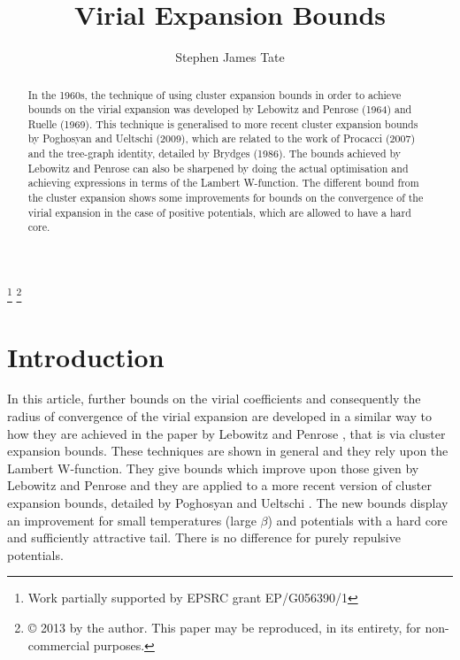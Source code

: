 \documentclass[reqno]{amsart}
\numberwithin{equation}{section}
\begin{document}
\title{Virial Expansion Bounds}


\author[S. J. Tate]{Stephen James Tate}
\address{Department of Mathematics, University of Warwick,
Coventry, CV4 7AL, United Kingdom}





\begin{abstract}
In the 1960s, the technique of using cluster expansion bounds in order to achieve bounds on the virial expansion was developed by Lebowitz and Penrose (1964) and Ruelle (1969). This technique is generalised to more recent cluster expansion bounds by Poghosyan and Ueltschi (2009), which are related to the work of Procacci (2007) and the tree-graph identity, detailed by Brydges (1986). The bounds achieved by Lebowitz and Penrose can also be sharpened by doing the actual optimisation and achieving expressions in terms of the Lambert W-function. The different bound from the cluster expansion shows some improvements for bounds on the convergence of the virial expansion in the case of positive potentials, which are allowed to have a hard core. 
\end{abstract}

\thanks{Work partially supported by EPSRC grant EP/G056390/1}
\thanks{\copyright{} 2013 by the author. This paper may be reproduced, in its
entirety, for non-commercial purposes.}

\maketitle


\section{Introduction}
\label{sec: intro}
In this article, further bounds on the virial coefficients and consequently the radius of convergence of the virial expansion are developed in a similar way to how they are achieved in the paper by Lebowitz and Penrose \cite{LPen64}, that is via cluster expansion bounds. These techniques are shown in general and they rely upon the Lambert W-function. They give bounds which improve upon those given by Lebowitz and Penrose and they are applied to a more recent version of cluster expansion bounds, detailed by Poghosyan and Ueltschi \cite{PU09}. The new bounds display an improvement for small temperatures (large $\beta$) and potentials with a hard core and sufficiently attractive tail. There is no difference for purely repulsive potentials.
\end{document}
